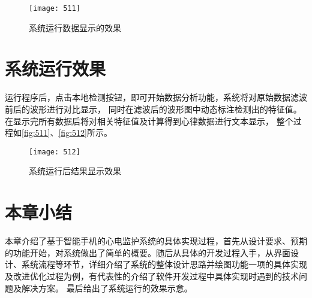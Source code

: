 \begin{figure}[htbp]
    \centering
    \texttt{[image: 511]}
    \caption{\label{fig:511}系统运行数据显示的效果}
\end{figure}
\section{系统运行效果}
运行程序后，点击本地检测按钮，即可开始数据分析功能，系统将对原始数据滤波前后的波形进行对比显示，
同时在滤波后的波形图中动态标注检测出的特征值。在显示完所有数据后将对相关特征值及计算得到心律数据进行文本显示，
整个过程如\autoref{fig:511}、\autoref{fig:512}所示。 

\begin{figure}[htbp]
    \centering
    \texttt{[image: 512]}
    \caption{\label{fig:512}系统运行后结果显示效果 }
\end{figure}

\section{本章小结}
本章介绍了基于智能手机的心电监护系统的具体实现过程，首先从设计要求、预期的功能开始，对系统做出了简单的概要。随后从具体的开发过程入手，从界面设计、系统流程等环节，详细介绍了系统的整体设计思路并绘图功能一项的具体实现及改进优化过程为例，有代表性的介绍了软件开发过程中具体实现时遇到的技术问题及解决方案。
最后给出了系统运行的效果示意。 
